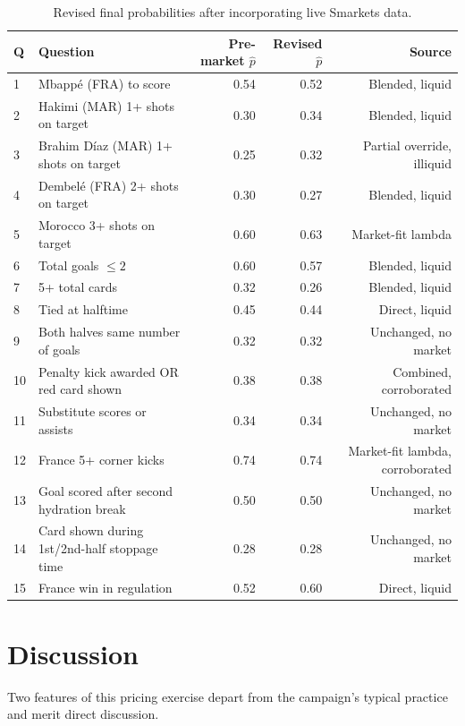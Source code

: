 \documentclass[11pt]{article}
\begin{document}
\begin{table}[H]
\centering
\caption{Revised final probabilities after incorporating live Smarkets data.}
\label{tab:revisedprices}
\begin{tabular}{p{0.6cm}p{8.4cm}rrr}
\toprule
Q & Question & Pre-market $\hat p$ & Revised $\hat p$ & Source \\
\midrule
1 & Mbapp\'e (FRA) to score & 0.54 & 0.52 & Blended, liquid \\
2 & Hakimi (MAR) 1+ shots on target & 0.30 & 0.34 & Blended, liquid \\
3 & Brahim D\'iaz (MAR) 1+ shots on target & 0.25 & 0.32 & Partial override, illiquid \\
4 & Dembel\'e (FRA) 2+ shots on target & 0.30 & 0.27 & Blended, liquid \\
5 & Morocco 3+ shots on target & 0.60 & 0.63 & Market-fit lambda \\
6 & Total goals $\le 2$ & 0.60 & 0.57 & Blended, liquid \\
7 & 5+ total cards & 0.32 & 0.26 & Blended, liquid \\
8 & Tied at halftime & 0.45 & 0.44 & Direct, liquid \\
9 & Both halves same number of goals & 0.32 & 0.32 & Unchanged, no market \\
10 & Penalty kick awarded OR red card shown & 0.38 & 0.38 & Combined, corroborated \\
11 & Substitute scores or assists & 0.34 & 0.34 & Unchanged, no market \\
12 & France 5+ corner kicks & 0.74 & 0.74 & Market-fit lambda, corroborated \\
13 & Goal scored after second hydration break & 0.50 & 0.50 & Unchanged, no market \\
14 & Card shown during 1st/2nd-half stoppage time & 0.28 & 0.28 & Unchanged, no market \\
15 & France win in regulation & 0.52 & 0.60 & Direct, liquid \\
\bottomrule
\end{tabular}
\end{table}

\section{Discussion}
\label{sec:discussion}

Two features of this pricing exercise depart from the campaign's typical practice and
merit direct discussion.
\end{document}
